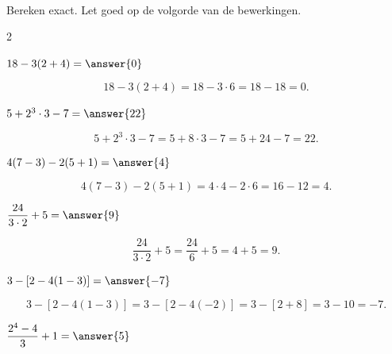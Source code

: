 \documentclass{ximera}
\begin{document}
\begin{oefening}[Rekenvolgorde]{\oefB\ESS}
    \\
    
    Bereken exact. Let goed op de volgorde van de bewerkingen.
    
    \begin{multicols}{2}
    
    \begin{question}
    $18-3(2+4)=\answer{0}$
    
    \begin{oplossing}
    \[
    18-3(2+4)
    =18-3\cdot6
    =18-18
    =0.
    \]
    \end{oplossing}
    \end{question}
    
    \begin{question}
    $5+2^3\cdot3-7=\answer{22}$
    
    \begin{oplossing}
    \[
    5+2^3\cdot3-7
    =5+8\cdot3-7
    =5+24-7
    =22.
    \]
    \end{oplossing}
    \end{question}
    
    \begin{question}
    $4(7-3)-2(5+1)=\answer{4}$
    
    \begin{oplossing}
    \[
    4(7-3)-2(5+1)
    =4\cdot4-2\cdot6
    =16-12
    =4.
    \]
    \end{oplossing}
    \end{question}
    
    \begin{question}
    $\dfrac{24}{3\cdot2}+5=\answer{9}$
    
    \begin{oplossing}
    \[
    \dfrac{24}{3\cdot2}+5
    =\dfrac{24}{6}+5
    =4+5
    =9.
    \]
    \end{oplossing}
    \end{question}
    
    \begin{question}
    $3-[2-4(1-3)]=\answer{-7}$
    
    \begin{oplossing}
    \[
    3-[2-4(1-3)]
    =3-[2-4(-2)]
    =3-[2+8]
    =3-10
    =-7.
    \]
    \end{oplossing}
    \end{question}
    
    \begin{question}
    $\dfrac{2^4-4}{3}+1=\answer{5}$
    

\end{question}
\end{multicols}
\end{oefening}
\end{document}
